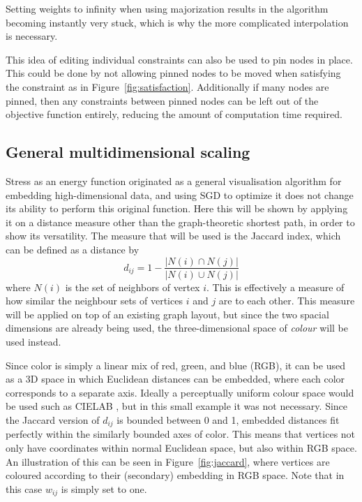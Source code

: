 Setting weights to infinity when using majorization results in the algorithm becoming instantly very stuck, which is why the more complicated interpolation \cite{Brandes2011} is necessary.

This idea of editing individual constraints can also be used to pin nodes in place. This could be done by not allowing pinned nodes to be moved when satisfying the constraint as in Figure~\ref{fig:satisfaction}. Additionally if many nodes are pinned, then any constraints between pinned nodes can be left out of the objective function entirely, reducing the amount of computation time required.


\subsection{General multidimensional scaling}
\label{sec:normal_mds}
Stress as an energy function originated as a general visualisation algorithm for embedding high-dimensional data, and using SGD to optimize it does not change its ability to perform this original function. Here this will be shown by applying it on a distance measure other than the graph-theoretic shortest path, in order to show its versatility. The measure that will be used is the Jaccard index, which can be defined as a distance by
\begin{equation}
  d_{ij} = 1 - \frac{|N(i) \cap N(j)|}{|N(i) \cup N(j)|}
  \label{eq:jaccard_sgd}
\end{equation}
where $N(i)$ is the set of neighbors of vertex $i$. This is effectively a measure of how similar the neighbour sets of vertices $i$ and $j$ are to each other.
This measure will be applied on top of an existing graph layout, but since the two spacial dimensions are already being used, the three-dimensional space of \emph{colour} will be used instead.

Since color is simply a linear mix of red, green, and blue (RGB), it can be used as a 3D space in which Euclidean distances can be embedded, where each color corresponds to a separate axis. Ideally a perceptually uniform colour space would be used such as CIELAB \cite{Smart2019}, but in this small example it was not necessary.
Since the Jaccard version of $d_{ij}$ is bounded between 0 and 1, embedded distances fit perfectly within the similarly bounded axes of color. This means that vertices not only have coordinates within normal Euclidean space, but also within RGB space. 
An illustration of this can be seen in Figure~\ref{fig:jaccard}, where vertices are coloured according to their (secondary) embedding in RGB space. Note that in this case $w_{ij}$ is simply set to one.

